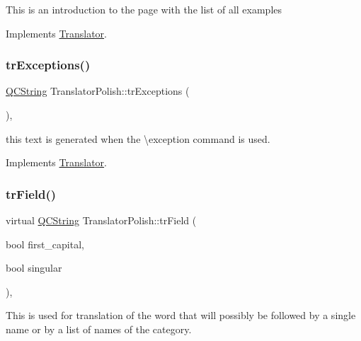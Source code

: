 This is an introduction to the page with the list of all examples 

Implements \mbox{\hyperlink{class_translator}{Translator}}.

\mbox{\label{class_translator_polish_a3aa24750d30c7cb91e001aa2a45d409a}} 
\subsubsection{\texorpdfstring{trExceptions()}{trExceptions()}}
{\footnotesize\ttfamily \mbox{\hyperlink{class_q_c_string}{Q\+C\+String}} Translator\+Polish\+::tr\+Exceptions (\begin{DoxyParamCaption}{ }\end{DoxyParamCaption})\hspace{0.3cm}{\ttfamily [inline]}, {\ttfamily [virtual]}}

this text is generated when the \textbackslash{}exception command is used. 

Implements \mbox{\hyperlink{class_translator}{Translator}}.

\mbox{\label{class_translator_polish_a6c534eb7b76b7bc38edc52275a5be426}} 
\subsubsection{\texorpdfstring{trField()}{trField()}}
{\footnotesize\ttfamily virtual \mbox{\hyperlink{class_q_c_string}{Q\+C\+String}} Translator\+Polish\+::tr\+Field (\begin{DoxyParamCaption}\item[{bool}]{first\+\_\+capital,  }\item[{bool}]{singular }\end{DoxyParamCaption})\hspace{0.3cm}{\ttfamily [inline]}, {\ttfamily [virtual]}}

This is used for translation of the word that will possibly be followed by a single name or by a list of names of the category. \mbox{\label{class_translator_polish_a0a1dab2f81c3273ed3b0970844ce977a}} 
